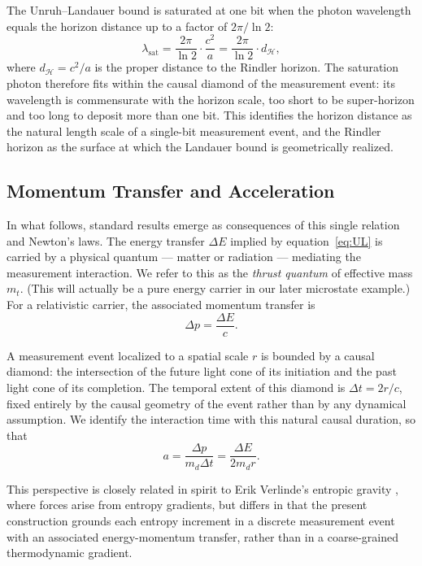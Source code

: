 \documentclass[12pt,a4paper]{article}
\begin{document}
The Unruh--Landauer bound is saturated at one bit when the 
photon wavelength equals the horizon distance up to a factor 
of $2\pi/\ln 2$:
\begin{equation}
\lambda_{\text{sat}} = \frac{2\pi}{\ln 2}\cdot\frac{c^2}{a} 
= \frac{2\pi}{\ln 2}\cdot d_{\mathcal{H}},
\end{equation}
where $d_{\mathcal{H}} = c^2/a$ is the proper distance to the 
Rindler horizon. The saturation photon therefore fits within 
the causal diamond of the measurement event: its wavelength 
is commensurate with the horizon scale, too short to be 
super-horizon and too long to deposit more than one bit. 
This identifies the horizon distance as the natural 
length scale of a single-bit measurement event, and 
the Rindler horizon as the surface at which the Landauer 
bound is geometrically realized.


\subsection{Momentum Transfer and Acceleration}
In what follows, standard results emerge as consequences of this single relation and Newton's laws. The energy transfer $\Delta E$ implied by equation~\eqref{eq:UL} is carried by a physical quantum — matter or radiation — mediating the measurement interaction. We refer to this as the \emph{thrust quantum} of effective mass $m_t$. (This will actually be a pure energy carrier in our later microstate example.)
For a relativistic carrier, the associated momentum transfer is
\begin{equation}
\Delta p = \frac{\Delta E}{c}.
\end{equation}

A measurement event localized to a spatial scale $r$ is bounded 
by a causal diamond: the intersection of the future light cone of 
its initiation and the past light cone of its completion. The 
temporal extent of this diamond is $\Delta t = 2r/c$, fixed entirely 
by the causal geometry of the event rather than by any dynamical 
assumption. We identify the interaction time with this natural causal 
duration, so that
\begin{equation}
a = \frac{\Delta p}{m_d \Delta t} = \frac{\Delta E}{2 m_d r}.
\label{eq:accel}
\end{equation}

This perspective is closely related in spirit to Erik Verlinde’s entropic gravity \cite{entropic}, where forces arise from entropy gradients, but differs in that the present construction grounds each entropy increment in a discrete measurement event with an associated energy-momentum transfer, rather than in a coarse-grained thermodynamic gradient.
\end{document}
